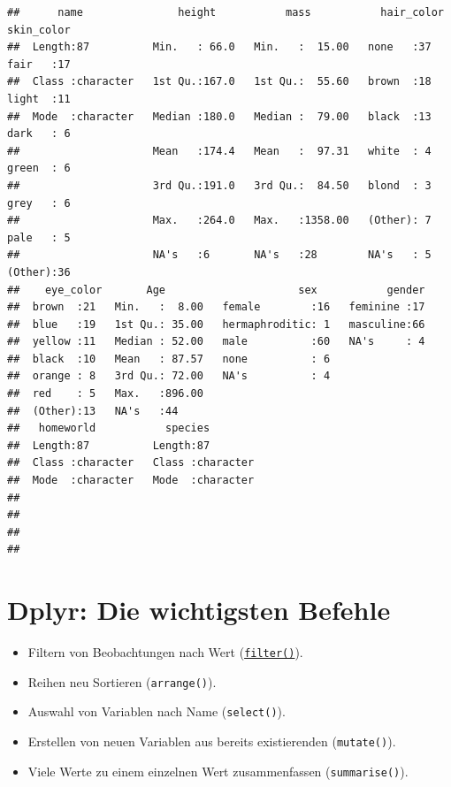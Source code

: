\documentclass[
]{book}
\theoremstyle{definition}
\theoremstyle{definition}
\theoremstyle{definition}
\theoremstyle{definition}
\theoremstyle{remark}
\begin{document}
\begin{verbatim}
##      name               height           mass           hair_color   skin_color
##  Length:87          Min.   : 66.0   Min.   :  15.00   none   :37   fair   :17  
##  Class :character   1st Qu.:167.0   1st Qu.:  55.60   brown  :18   light  :11  
##  Mode  :character   Median :180.0   Median :  79.00   black  :13   dark   : 6  
##                     Mean   :174.4   Mean   :  97.31   white  : 4   green  : 6  
##                     3rd Qu.:191.0   3rd Qu.:  84.50   blond  : 3   grey   : 6  
##                     Max.   :264.0   Max.   :1358.00   (Other): 7   pale   : 5  
##                     NA's   :6       NA's   :28        NA's   : 5   (Other):36  
##    eye_color       Age                     sex           gender  
##  brown  :21   Min.   :  8.00   female        :16   feminine :17  
##  blue   :19   1st Qu.: 35.00   hermaphroditic: 1   masculine:66  
##  yellow :11   Median : 52.00   male          :60   NA's     : 4  
##  black  :10   Mean   : 87.57   none          : 6                 
##  orange : 8   3rd Qu.: 72.00   NA's          : 4                 
##  red    : 5   Max.   :896.00                                     
##  (Other):13   NA's   :44                                         
##   homeworld           species         
##  Length:87          Length:87         
##  Class :character   Class :character  
##  Mode  :character   Mode  :character  
##                                       
##                                       
##                                       
## 
\end{verbatim}

\hypertarget{dplyr-die-wichtigsten-befehle}{%
\section{Dplyr: Die wichtigsten Befehle}\label{dplyr-die-wichtigsten-befehle}}

\begin{itemize}
\item
  Filtern von Beobachtungen nach Wert (\href{https://rdrr.io/r/stats/filter.html}{\texttt{filter()}}).
\item
  Reihen neu Sortieren (\texttt{arrange()}).
\item
  Auswahl von Variablen nach Name (\texttt{select()}).
\item
  Erstellen von neuen Variablen aus bereits existierenden (\texttt{mutate()}).
\item
  Viele Werte zu einem einzelnen Wert zusammenfassen (\texttt{summarise()}).
\end{itemize}
\end{document}
